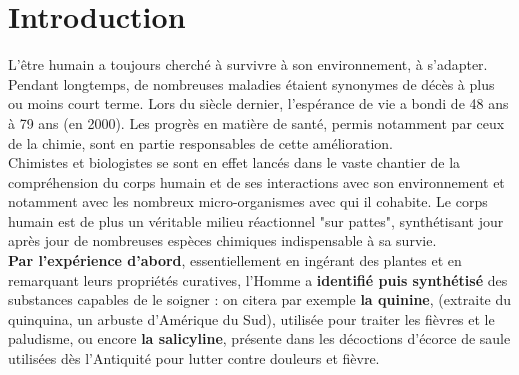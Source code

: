\documentclass[11pt,a4paper]{report}
\begin{document}
\newpage
\section*{Introduction}

L'être humain a toujours cherché à survivre à son environnement, à s'adapter. Pendant longtemps, de nombreuses maladies étaient synonymes de décès à plus ou moins court terme. Lors du siècle dernier, l'espérance de vie a bondi de 48 ans à 79 ans (en 2000). Les progrès en matière de santé, permis notamment par ceux de la chimie, sont en partie responsables de cette amélioration.\\

Chimistes et biologistes se sont en effet lancés dans le vaste chantier de la compréhension du corps humain et de ses interactions avec son environnement et notamment avec les nombreux micro-organismes avec qui il cohabite. Le corps humain est de plus un véritable milieu réactionnel "sur pattes", synthétisant jour après jour de nombreuses espèces chimiques indispensable à sa survie.\\

\textbf{Par l'expérience d'abord}, essentiellement en ingérant des plantes et en remarquant leurs propriétés curatives, l'Homme a \textbf{identifié puis synthétisé} des substances capables de le soigner : on citera par exemple \textbf{la quinine}, (extraite du quinquina, un arbuste d'Amérique du Sud), utilisée pour traiter les fièvres et le paludisme, ou encore \textbf{la salicyline}, présente dans les décoctions d'écorce de saule utilisées dès l'Antiquité pour lutter contre douleurs et fièvre.\\
\end{document}
